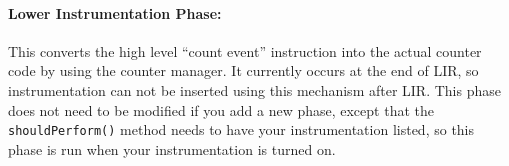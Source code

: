 \paragraph{Lower Instrumentation Phase:}  This 
converts the high level ``count event'' instruction into the actual
counter code by using the counter manager.  It currently occurs at the
end of LIR, so instrumentation can not be inserted using this
mechanism after LIR.  This phase does not need to be modified if you
add a new phase, except that the {\tt shouldPerform()} method needs to
have your instrumentation listed, so this phase is run when your
instrumentation is turned on.


